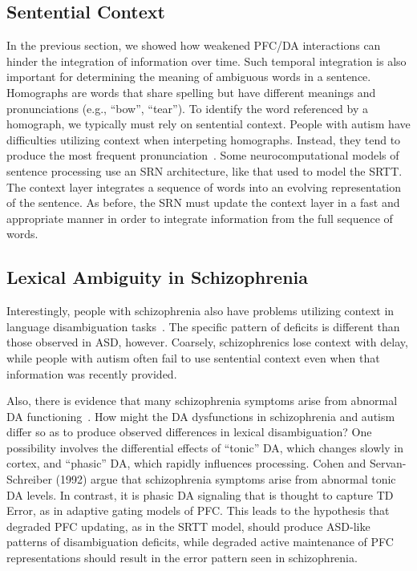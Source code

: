 %
%

\subsection{Sentential Context}
In the previous section, we showed how weakened PFC/DA interactions can hinder the integration of information over time. Such temporal integration is also important for determining the meaning of ambiguous words in a sentence. Homographs are words that share spelling but have different meanings and pronunciations (e.g., ``bow'', ``tear''). To identify the word referenced by a homograph, we typically must rely on sentential context. People with autism have difficulties utilizing context when interpeting homographs. Instead, they tend to produce the most frequent pronunciation~\cite{HappeF:1997:WCC_Homographs}. Some neurocomputational models of sentence processing use an SRN architecture, like that used to model the SRTT. The context layer integrates a sequence of words into an evolving representation of the sentence. As before, the SRN must update the context layer in a fast and appropriate manner in order to integrate information from the full sequence of words.

\subsection{Lexical Ambiguity in Schizophrenia}
Interestingly, people with schizophrenia also have problems utilizing context in language disambiguation tasks~\cite{CohenJD:1992:Schizophrenia}. The specific pattern of deficits is different than those observed in ASD, however. Coarsely, schizophrenics lose context with delay, while people with autism often fail to use sentential context even when that information was recently provided.

Also, there is evidence that many schizophrenia symptoms arise from abnormal DA functioning~\cite{CohenJD:1992:Schizophrenia}. How might the DA dysfunctions in schizophrenia and autism differ so as to produce observed differences in lexical disambiguation? One possibility involves the differential effects of ``tonic'' DA, which changes slowly in cortex, and ``phasic'' DA, which rapidly influences processing. Cohen and Servan-Schreiber (1992) argue that schizophrenia symptoms arise from abnormal tonic DA levels. In contrast, it is phasic DA signaling that is thought to capture TD Error, as in adaptive gating models of PFC. This leads to the hypothesis that degraded PFC updating, as in the SRTT model, should produce ASD-like patterns of disambiguation deficits, while degraded active maintenance of PFC representations should result in the error pattern seen in schizophrenia.

